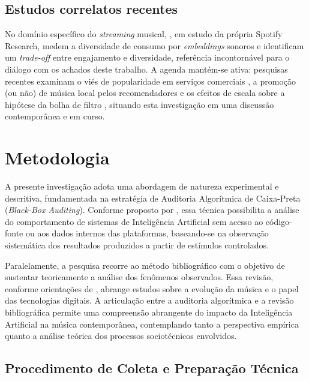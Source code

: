 \documentclass[12pt, %
openright,
oneside, %
a4paper,    %
english,   %
brazil]{facom-ufu-abntex2}
\begin{document}
\section{Estudos correlatos recentes}

No domínio específico do \emph{streaming} musical,
, em estudo da própria Spotify Research,
medem a diversidade de consumo por \emph{embeddings} sonoros e identificam um
\emph{trade-off} entre engajamento e diversidade, referência incontornável
para o diálogo com os achados deste trabalho. A agenda mantém-se ativa:
pesquisas recentes examinam o viés de popularidade em serviços comerciais
\cite{turnbull2022exploring}, a promoção (ou não) de música local pelos
recomendadores \cite{matrosova2024recommender} e os efeitos de escala sobre a
hipótese da bolha de filtro \cite{shakespeare2025reframing}, situando esta
investigação em uma discussão contemporânea e em curso.

\chapter{Metodologia}
\label{cap:metodologia}

A presente investigação adota uma abordagem de natureza experimental e
descritiva, fundamentada na estratégia de Auditoria Algorítmica de Caixa-Preta
(\emph{Black-Box Auditing}). Conforme proposto por
, essa técnica possibilita a análise do
comportamento de sistemas de Inteligência Artificial sem acesso ao código-fonte
ou aos dados internos das plataformas, baseando-se na observação sistemática dos
resultados produzidos a partir de estímulos controlados.

Paralelamente, a pesquisa recorre ao método bibliográfico com o objetivo de
sustentar teoricamente a análise dos fenômenos observados. Essa revisão,
conforme orientações de , abrange estudos sobre a
evolução da música e o papel das tecnologias digitais. A articulação entre a
auditoria algorítmica e a revisão bibliográfica permite uma compreensão
abrangente do impacto da Inteligência Artificial na música contemporânea,
contemplando tanto a perspectiva empírica quanto a análise teórica dos processos
sociotécnicos envolvidos.

\section{Procedimento de Coleta e Preparação Técnica}
\end{document}
